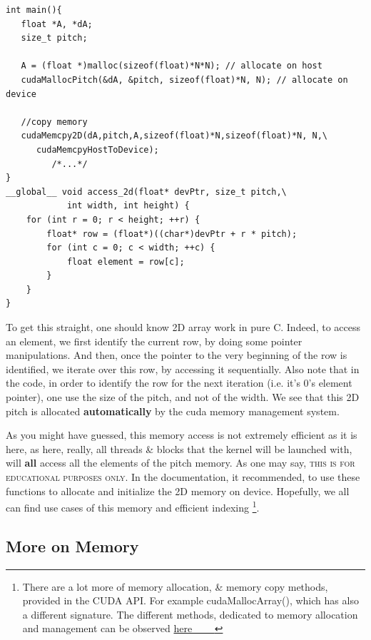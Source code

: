 \begin{listing}[!ht]
\begin{verbatim}
int main(){
   float *A, *dA;
   size_t pitch;
     
   A = (float *)malloc(sizeof(float)*N*N); // allocate on host
   cudaMallocPitch(&dA, &pitch, sizeof(float)*N, N); // allocate on device

   //copy memory
   cudaMemcpy2D(dA,pitch,A,sizeof(float)*N,sizeof(float)*N, N,\
      cudaMemcpyHostToDevice);
         /*...*/
}
__global__ void access_2d(float* devPtr, size_t pitch,\
            int width, int height) {
    for (int r = 0; r < height; ++r) {
        float* row = (float*)((char*)devPtr + r * pitch);
        for (int c = 0; c < width; ++c) {
            float element = row[c];
        }
    }
}
\end{verbatim}
\caption{To get this straight, one should know 2D array work in pure C. 
  Indeed, to access an element, we first identify the current row, by doing some pointer manipulations. 
  And then, once the pointer to the very beginning of the row is identified, we iterate over this 
  row, by accessing it sequentially. Also note that in the code, in order to identify the 
  row for the next iteration (i.e. it's $0$'s element pointer), one use the size of the pitch, and 
  not of the width. We see that this 2D pitch is allocated 
    \textbf{automatically} by the cuda memory management system.\cite{blog_2020}}
\label{allocation2d}
\end{listing}
As you might have guessed, this memory access is not extremely efficient as it is here, as here, really, 
all threads \& blocks that the kernel will be launched with, will \textbf{all} access all the elements of the 
pitch memory. As one may say, \textsc{this is for educational purposes only}. In the documentation, it recommended, 
to use these functions to allocate and initialize the 2D memory on device. Hopefully, we all can find 
use cases of this memory and efficient indexing \footnote{There are a lot more of memory allocation, \& memory copy methods, 
provided in the CUDA API. For example {\fontfamily{pcr}\selectfont cudaMallocArray()}, which has also a different signature.
The different methods, dedicated to memory allocation and management can be observed \href{https://courses.cs.duke.edu/cps296.3/fall09/cuda_docs/html/group__CUDART__MEMORY_ge56101fe6f1ce0b48f163632f6862ae4.html#ge56101fe6f1ce0b48f163632f6862ae4}{here___}}.

\subsection{More on Memory}
